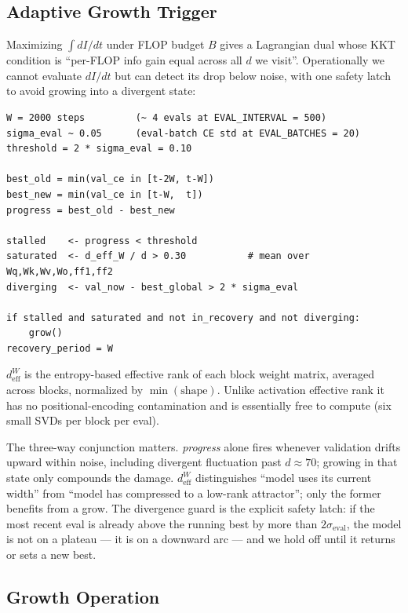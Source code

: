 \documentclass{article}
\newcommand{\deff}{d_{\mathrm{eff}}}
\begin{document}
\subsection{Adaptive Growth Trigger}
\label{sec:trigger}

Maximizing $\int dI/dt$ under FLOP budget $B$ gives a Lagrangian dual whose
KKT condition is ``per-FLOP info gain equal across all $d$ we visit''.
Operationally we cannot evaluate $dI/dt$ but can detect its drop below
noise, with one safety latch to avoid growing into a divergent state:

\begin{lstlisting}
W = 2000 steps         (~ 4 evals at EVAL_INTERVAL = 500)
sigma_eval ~ 0.05      (eval-batch CE std at EVAL_BATCHES = 20)
threshold = 2 * sigma_eval = 0.10

best_old = min(val_ce in [t-2W, t-W])
best_new = min(val_ce in [t-W,  t])
progress = best_old - best_new

stalled    <- progress < threshold
saturated  <- d_eff_W / d > 0.30           # mean over Wq,Wk,Wv,Wo,ff1,ff2
diverging  <- val_now - best_global > 2 * sigma_eval

if stalled and saturated and not in_recovery and not diverging:
    grow()
recovery_period = W
\end{lstlisting}

$\deff^W$ is the entropy-based effective rank of each block weight matrix,
averaged across blocks, normalized by $\min(\mathrm{shape})$.  Unlike
activation effective rank it has no positional-encoding contamination and
is essentially free to compute (six small SVDs per block per eval).

The three-way conjunction matters.  \emph{progress} alone fires whenever
validation drifts upward within noise, including divergent fluctuation past
$d \approx 70$; growing in that state only compounds the damage.  $\deff^W$
distinguishes ``model uses its current width'' from ``model has compressed
to a low-rank attractor''; only the former benefits from a grow.  The
divergence guard is the explicit safety latch: if the most recent eval is
already above the running best by more than $2\sigma_{\text{eval}}$, the
model is not on a plateau --- it is on a downward arc --- and we hold off
until it returns or sets a new best.

\subsection{Growth Operation}
\label{sec:asymmetric-init}
\end{document}
